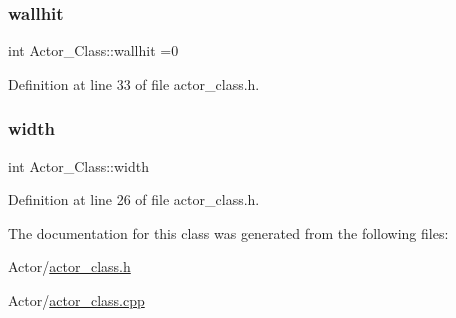 \subsubsection{\texorpdfstring{wallhit}{wallhit}}
{\footnotesize\ttfamily int Actor\+\_\+\+Class\+::wallhit =0}



Definition at line 33 of file actor\+\_\+class.\+h.

\hypertarget{class_actor___class_ab409e2de6684381c116ba5f157cfb003}{}\label{class_actor___class_ab409e2de6684381c116ba5f157cfb003} 
\subsubsection{\texorpdfstring{width}{width}}
{\footnotesize\ttfamily int Actor\+\_\+\+Class\+::width}



Definition at line 26 of file actor\+\_\+class.\+h.



The documentation for this class was generated from the following files\+:\begin{DoxyCompactItemize}
\item 
Actor/\hyperlink{actor__class_8h}{actor\+\_\+class.\+h}\item 
Actor/\hyperlink{actor__class_8cpp}{actor\+\_\+class.\+cpp}\end{DoxyCompactItemize}

